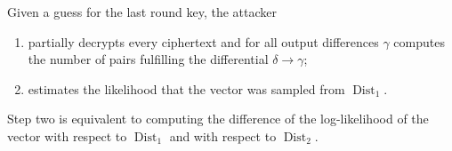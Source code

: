 \documentclass[11pt]{beamer}
\newcommand{\cbox}[3]{\draw[fill=#3] (#1,#2) -- (#1,0) -- (#1+1,0) -- (#1+1,#2) -- cycle;}
\DeclareMathOperator{\D}{\mathcal{D}}
\DeclareMathOperator{\Dist}{Dist}
\begin{document}
\begin{frame}
\framebreak

Given a guess for the last round key, the attacker 

\begin{enumerate}
 \item partially decrypts every ciphertext and for all output differences $\gamma$ computes the number of pairs fulfilling the differential $\delta \rightarrow \gamma$; 
 \item estimates the likelihood that the vector was sampled from $\Dist_1$. 
\end{enumerate}

\vspace{1em}

\begin{block}{}
Step two is equivalent to computing the difference of the log-likelihood of the vector with respect to $\Dist_1$ and with respect to $\Dist_2$.
\end{block}

\framebreak

\begin{center}
\end{center}

\begin{center}
\end{center}

\begin{center}
\end{center}


\framebreak


\end{frame}
\end{document}
